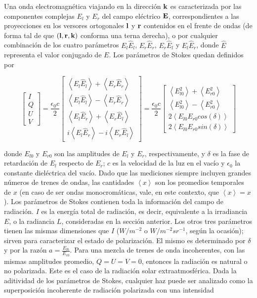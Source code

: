 Una onda electromagnética viajando en la dirección $\bf{k}$ es caracterizada por las componentes complejas $E_{l}$ y 
$E_{r}$ del campo eléctrico $\bf{E}$, correspondientes a las proyecciones en los versores ortogonales $\bf{l}$ y $\bf{r}$
contenidos en el frente de ondas (de forma tal de que $(\bf{l},\bf{r},\bf{k})$ conforma una terna derecha), o por cualquier combinación de los cuatro parámetros $E_{l}\hat{E}_{l}$, $E_{r}\hat{E}_{r}$, $E_{r}\hat{E}_{l}$ y $E_{l}\hat{E}_{r}$, donde
$\hat{E}$ representa el valor conjugado de $E$. Los parámetros de Stokes quedan definidos por

\begin{equation}
\begin{bmatrix} 
I \\ Q \\ U \\ V 
\end{bmatrix}
=\frac{\epsilon_{0}c}{2}
\begin{bmatrix}
\left<{E_{l}\hat{E}_{l}}\right>+\left<{E_{r}\hat{E}_{r}}\right>\\
\left<{E_{l}\hat{E}_{l}}\right>-\left<{E_{r}\hat{E}_{r}}\right> \\
\left<{E_{l}\hat{E}_{r}}\right>+\left<{E_{r}\hat{E}_{l}}\right> \\
i\left<{E_{l}\hat{E}_{r}}\right>-i\left<{E_{r}\hat{E}_{l}}\right> 
\end{bmatrix}
=\frac{\epsilon_{0}c}{2}
\begin{bmatrix}
\left<{E_{l0}^{2}}\right>+\left<{E_{r0}^{2}}\right>\\
\left<{E_{l0}^{2}}\right>-\left<{E_{r0}^{2}}\right>\\
2\left<{E_{l0}E_{r0}cos(\delta)}\right>\\
2\left<{E_{l0}E_{r0}sin(\delta)}\right>
\end{bmatrix}
\label{lenoble5}
\end{equation}

donde $E_{l0}$ y $E_{r0}$ son las amplitudes de $E_{l}$ y $E_{r}$, respectivamente, y $\delta$ es la fase de retardación
de $E_{l}$ respecto de $E_{r}$; $c$ es la velocidad de la luz en el vacío y $\epsilon_{0}$ la constante dieléctrica del
vacío. Dado que las mediciones siempre incluyen grandes números de trenes de ondas, las cantidades $\left<{x}\right>$
son los promedios temporales de $x$ (en caso de ser ondas monocromáticas, vale, en este contexto, que $\left<{x}\right>=x$).
Los parámetros de Stokes contienen toda la información del campo de radiación. $I$ es la energía total de radiación, 
es decir, equivalente a la irradiancia $E$, o la radiancia $L$, consideradas en la sección anterior. Los otros tres parámetros
tienen las mismas dimensiones que $I$ ($W/m^{-2}$ o $W/m^{-2}sr^{-1}$, según la ocasión); sirven para caracterizar el estado 
de polarización. El mismo es determinado por $\delta$ y por la razón $a=\frac{E_{l0}}{E_{r0}}$. Para una mezcla de
trenes de onda incoherentes, con las mismas amplitudes promedio, $Q=U=V=0$, entonces la radiación es natural o 
no polarizada. Este es el caso de la radiación solar extraatmosférica. Dada la aditividad de los parámetros de Stokes, cualquier haz puede ser analizado como la superposición incoherente de
radiación polarizada con una intensidad

